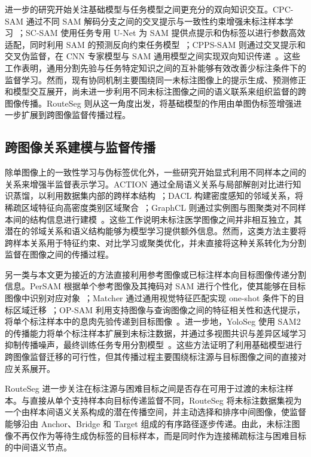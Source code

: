 \documentclass[UTF8,a4paper,10pt]{ctexart}
\begin{document}
进一步的研究开始关注基础模型与任务模型之间更充分的双向知识交互。CPC-SAM 通过不同 SAM 解码分支之间的交叉提示与一致性约束增强未标注样本学习~\cite{miao2024cpcsam}；SC-SAM 使用任务专用 U-Net 为 SAM 提供点提示和伪标签以进行参数高效适配，同时利用 SAM 的预测反向约束任务模型~\cite{vu2026scsam}；CPPS-SAM 则通过交叉提示和交叉伪监督，在 CNN 专家模型与 SAM 通用模型之间实现双向知识传递~\cite{zhang2026cppssam}。这些工作表明，通用分割先验与任务特定知识之间的互补能够有效改善少标注条件下的监督学习。然而，现有协同机制主要围绕同一未标注图像上的提示生成、预测修正和模型交互展开，尚未进一步利用不同未标注图像之间的语义联系来组织监督的跨图像传播。RouteSeg 则从这一角度出发，将基础模型的作用由单图伪标签增强进一步扩展到跨图像监督传播过程。

\subsection{跨图像关系建模与监督传播}

除单图像上的一致性学习与伪标签优化外，一些研究开始显式利用不同样本之间的关系来增强半监督表示学习。ACTION 通过全局语义关系与局部解剖对比进行知识蒸馏，以利用数据集内部的跨样本结构~\cite{you2022action}；DACL 构建密度感知的邻域关系，将稀疏区域特征向高密度类别区域聚合~\cite{tang2024dacl}；GraphCL 则通过实例图与图聚类对不同样本间的结构信息进行建模~\cite{wang2024graphcl}。这些工作说明未标注医学图像之间并非相互独立，其潜在的邻域关系和语义结构能够为模型学习提供额外信息。然而，这类方法主要将跨样本关系用于特征约束、对比学习或聚类优化，并未直接将这种关系转化为分割监督在图像之间的传播过程。

另一类与本文更为接近的方法直接利用参考图像或已标注样本向目标图像传递分割信息。PerSAM 根据单个参考图像及其掩码对 SAM 进行个性化，使其能够在目标图像中识别对应对象~\cite{zhang2023persam}；Matcher 通过通用视觉特征匹配实现 one-shot 条件下的目标区域迁移~\cite{liu2023matcher}；OP-SAM 利用支持图像与查询图像之间的特征相关性和迭代提示，将单个标注样本中的息肉先验传递到目标图像~\cite{mao2025opsam}。进一步地，YoloSeg 使用 SAM2 的传播能力将单个标注样本扩展到未标注数据，并通过多视图共识与差异区域学习抑制传播噪声，最终训练任务专用分割模型~\cite{zhang2026yoloseg}。这些方法证明了利用基础模型进行跨图像监督迁移的可行性，但其传播过程主要围绕标注源与目标图像之间的直接对应关系展开。

RouteSeg 进一步关注在标注源与困难目标之间是否存在可用于过渡的未标注样本。与直接从单个支持样本向目标传递监督不同，RouteSeg 将未标注数据集视为一个由样本间语义关系构成的潜在传播空间，并主动选择和排序中间图像，使监督能够沿由 Anchor、Bridge 和 Target 组成的有序路径逐步传递。由此，未标注图像不再仅作为等待生成伪标签的目标样本，而是同时作为连接稀疏标注与困难目标的中间语义节点。
\end{document}
